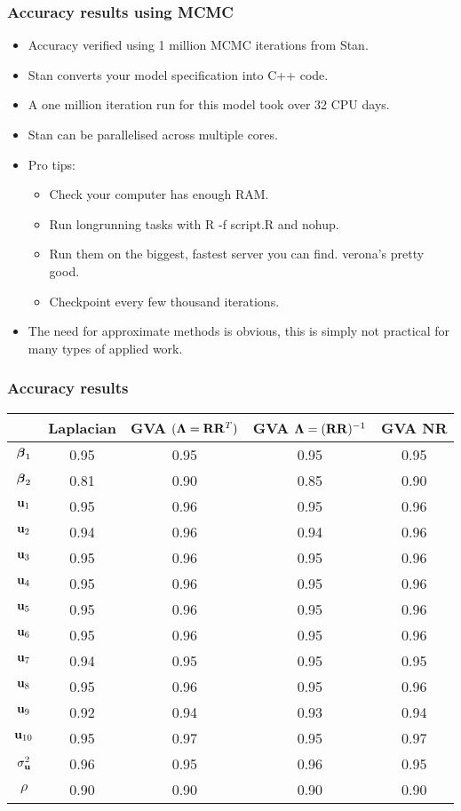 \documentclass{beamer}
\begin{document}
\begin{frame}
\frametitle{Accuracy results using MCMC}
\begin{itemize}
\item Accuracy verified using 1 million MCMC iterations from Stan.
\item Stan converts your model specification into C++ code.
\item A one million iteration run for this model took over 32 CPU days.
\item Stan can be parallelised across multiple cores.
\item Pro tips:
\begin{itemize}
\item Check your computer has enough RAM.
\item Run longrunning tasks with R -f script.R and nohup.
\item Run them on the biggest, fastest server you can find. verona's pretty good.
\item Checkpoint every few thousand iterations.
\end{itemize}
\item The need for approximate methods is obvious, this is simply not
practical for many types of applied work.
\end{itemize}
\end{frame}

\begin{frame}
\frametitle{Accuracy results}
\begin{tabular}{ccccc}
\hline
	& Laplacian & GVA $({\boldsymbol \Lambda}={\bf R} {\bf R}^T)$ & GVA ${\boldsymbol \Lambda}=({\bf R} {\bf R})^{-1}$ & GVA NR \\
\hline
${\boldsymbol \beta}_1$&0.95&0.95&0.95&0.95 \\
${\boldsymbol \beta}_2$&0.81&0.90&0.85&0.90 \\
${\bf u}_1$&0.95&0.96&0.95&0.96 \\
${\bf u}_2$&0.94&0.96&0.94&0.96 \\
${\bf u}_3$&0.95&0.96&0.95&0.96 \\
${\bf u}_4$&0.95&0.96&0.95&0.96 \\
${\bf u}_5$&0.95&0.96&0.95&0.96 \\
${\bf u}_6$&0.95&0.96&0.95&0.96 \\
${\bf u}_7$&0.94&0.95&0.95&0.95 \\
${\bf u}_8$&0.95&0.96&0.95&0.96 \\
${\bf u}_9$&0.92&0.94&0.93&0.94 \\
${\bf u}_{10}$&0.95&0.97&0.95&0.97 \\
$\sigma_{\bf u}^2$&0.96&0.95&0.96&0.95 \\
$\rho$&0.90&0.90&0.90&0.90 \\
\hline
\end{tabular}
\end{frame}
\end{document}

